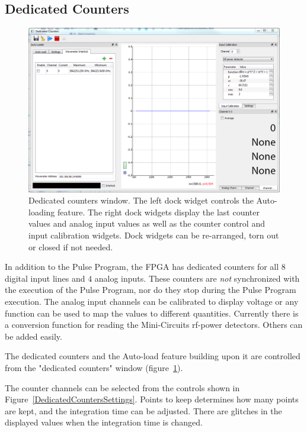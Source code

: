 \documentclass[11pt]{scrartcl}
\begin{document}
\subsection{Dedicated Counters}
\begin{figure}[htbp]
\begin{center}
\includegraphics[width=\textwidth]{DedicatedCounters}
\end{center}
\caption{\label{DedicatedCounters} Dedicated counters window. The left dock widget controls the Auto-loading feature. The right dock widgets display the last counter values and analog input values as well as the counter control and input calibration widgets. Dock widgets can be re-arranged, torn out or closed if not needed. }
\end{figure}
In addition to the Pulse Program, the FPGA has dedicated counters for all $8$ digital input lines and $4$ analog inputs. These counters are {\em not} synchronized with the execution of the Pulse Program, nor do they stop during the Pulse Program execution. The analog input channels can be calibrated to display voltage or any function can be used to map the values to different quantities. Currently there is a conversion function for reading the Mini-Circuits rf-power detectors. Others can be added easily.

The dedicated counters and  the Auto-load feature building upon it are controlled from the "dedicated counters" window (figure~\ref{DedicatedCounters}). 

The counter channels can be selected from the controls shown in Figure~\ref{DedicatedCountersSettings}. Points to keep determines how many points are kept, and the integration time can be adjusted. There are glitches in the displayed values when the integration time is changed.
\end{document}
